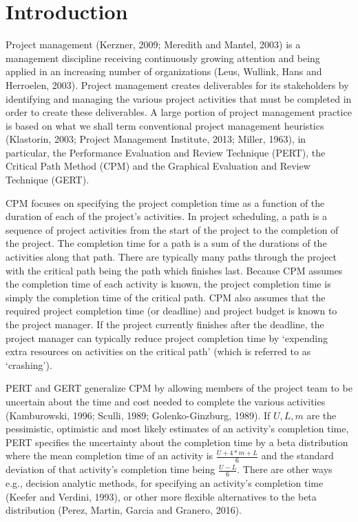 \documentclass[11pt]{article}
\begin{document}
\section {Introduction}
         Project management (Kerzner, 2009; Meredith and Mantel, 2003) is a management discipline receiving continuously growing attention and being applied in an increasing number of organizations (Leus, Wullink, Hans and Herroelen, 2003).  Project management creates deliverables for its stakeholders by identifying and managing the various project activities that must be completed in order to create these deliverables.   A large portion of project management practice is based on what we shall term conventional project management heuristics (Klastorin, 2003; Project Management Institute, 2013; Miller, 1963), in particular, the Performance Evaluation and Review Technique (PERT), the Critical Path Method (CPM) and the Graphical Evaluation and Review Technique (GERT). \par
           CPM focuses on specifying the project completion time as a function of the duration of each of the project's activities.  In project scheduling, a path is a sequence of project activities from the start of the project to the completion of the project.  The completion time for a path is a sum of the durations of the activities along that path.   There are typically many paths through the project with the critical path being the path which finishes last.   Because CPM assumes the completion time of each activity is known, the project completion time is simply the completion time of the critical path.  CPM also assumes that the required project completion time (or deadline) and project budget is known to the project manager.  If the project currently finishes after the deadline, the project manager can typically reduce project completion time by `expending extra resources on activities on the critical path' (which is referred to as `crashing').  
         \par PERT and GERT generalize CPM by allowing members of the project team to be uncertain about the time and cost needed to complete the various activities (Kamburowski, 1996; Sculli, 1989; Golenko-Ginzburg, 1989).  If  $U,L,m$ are the pessimistic, optimistic and most likely estimates of an activity's completion time, PERT specifies the uncertainty about the completion time by a beta distribution where the mean completion time of an activity is $\frac{U+4*m+L}{6}$ and the standard deviation of that activity's completion time being $\frac{U-L}{6}$.  There are other ways e.g., decision analytic methods, for specifying an activity's completion time (Keefer and Verdini, 1993), or other more flexible alternatives to the beta distribution (Perez, Martin, Garcia and Granero, 2016).
\end{document}
